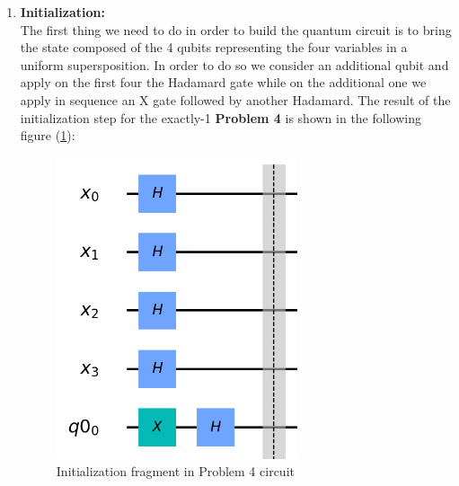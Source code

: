 \documentclass[english]{article}
\begin{document}
				\begin{enumerate}
					\item \textbf{Initialization:}\\
						The first thing we need to do in order to build the quantum circuit is to bring the state composed of the 4 qubits representing the four variables in a uniform supersposition. In order to do so we consider an additional qubit and apply on the first four the Hadamard gate while on the additional one we apply in sequence an X gate followed by another Hadamard. The result of the initialization step for the exactly-1 \textbf{Problem 4} is shown in the following figure (\ref{fig:initializationCircuit}):
						\begin{figure}[h]
							\centering
							\includegraphics[scale=0.6]{Initialization_Circuit.png}
							\caption{
								\label{fig:initializationCircuit}
								Initialization fragment in Problem 4 circuit
							}
						\end{figure}
					

\end{enumerate}
\end{document}
